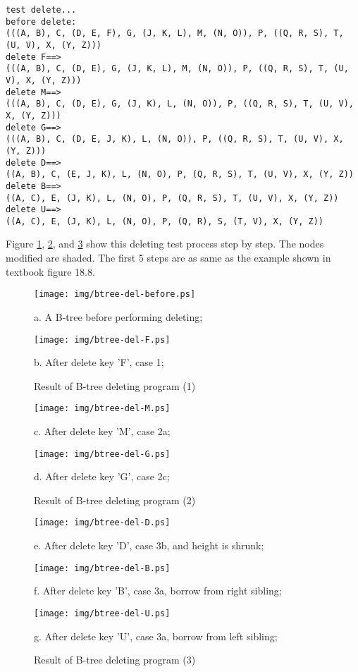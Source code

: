 \documentclass{article}
\begin{document}
\begin{verbatim}
test delete...
before delete:
(((A, B), C, (D, E, F), G, (J, K, L), M, (N, O)), P, ((Q, R, S), T, (U, V), X, (Y, Z)))
delete F==>
(((A, B), C, (D, E), G, (J, K, L), M, (N, O)), P, ((Q, R, S), T, (U, V), X, (Y, Z)))
delete M==>
(((A, B), C, (D, E), G, (J, K), L, (N, O)), P, ((Q, R, S), T, (U, V), X, (Y, Z)))
delete G==>
(((A, B), C, (D, E, J, K), L, (N, O)), P, ((Q, R, S), T, (U, V), X, (Y, Z)))
delete D==>
((A, B), C, (E, J, K), L, (N, O), P, (Q, R, S), T, (U, V), X, (Y, Z))
delete B==>
((A, C), E, (J, K), L, (N, O), P, (Q, R, S), T, (U, V), X, (Y, Z))
delete U==>
((A, C), E, (J, K), L, (N, O), P, (Q, R), S, (T, V), X, (Y, Z))
\end{verbatim}

Figure \ref{fig:result-del1}, \ref{fig:result-del2}, and \ref{fig:result-del3}
show this deleting test process step by step. The nodes modified are shaded.
The first 5 steps are as same as the example shown in textbook\cite{CLRS} figure 18.8.

\begin{figure}[htbp]
    \begin{center}
      \texttt{[image: img/btree-del-before.ps]}

      a. A B-tree before performing deleting;

      \texttt{[image: img/btree-del-F.ps]}

      b. After delete key 'F', case 1;
      \caption{Result of B-tree deleting program (1)} \label{fig:result-del1}
    \end{center}
\end{figure}

\begin{figure}[htbp]
    \begin{center}
      \texttt{[image: img/btree-del-M.ps]}

      c. After delete key 'M', case 2a;

      \texttt{[image: img/btree-del-G.ps]}

      d. After delete key 'G', case 2c;
      \caption{Result of B-tree deleting program (2)} \label{fig:result-del2}
    \end{center}
\end{figure}

\begin{figure}[htbp]
    \begin{center}
      \texttt{[image: img/btree-del-D.ps]}

      e. After delete key 'D', case 3b, and height is shrunk;

      \texttt{[image: img/btree-del-B.ps]}

      f. After delete key 'B', case 3a, borrow from right sibling;

      \texttt{[image: img/btree-del-U.ps]}

      g. After delete key 'U', case 3a, borrow from left sibling;

      \caption{Result of B-tree deleting program (3)} \label{fig:result-del3}
    \end{center}
\end{figure}
\end{document}
